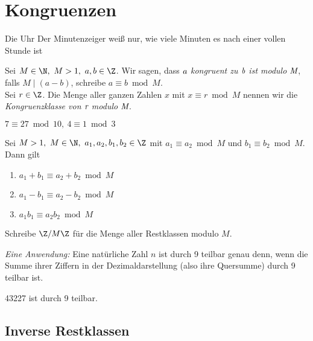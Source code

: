 \chapter{Kongruenzen}\video

\begin{exmp*}
	Die Uhr
	Der Minutenzeiger weiß nur, wie viele Minuten es nach einer vollen Stunde ist
\end{exmp*}

\begin{defn*}
	Sei $M \in \N,\ M > 1,\ a,b \in \Z$. Wir sagen, dass \emph{$\emph{a}$ kongruent zu $\emph{b}$ ist modulo $\emph{M}$}, falls \( M \mid (a-b) \), schreibe \( a \equiv b \bmod M \).\\
	Sei $r \in \Z$. Die Menge aller ganzen Zahlen $x$ mit $x \equiv r \bmod M$ nennen wir die \emph{Kongruenzklasse von $\emph{r}$ modulo $\emph{M}$}.
\end{defn*}

\begin{exmp*}
	\( 7 \equiv  27 \bmod 10,\ 4 \equiv 1 \bmod 3 \)
\end{exmp*}

\begin{lem}\autolabel
	Sei $M > 1,\ M \in \N,\ a_1,a_2,b_1,b_2 \in \Z$ mit $a_1 \equiv a_2 \bmod M$ und $b_1 \equiv b_2 \bmod M$. Dann gilt
	\begin{enumerate}[label={\roman*})]
		\item $a_1 + b_1 \equiv a_2 + b_2 \bmod M$
		\item $a_1 - b_1 \equiv a_2 - b_2 \bmod M$
		\item $a_1b_1 \equiv a_2b_2 \bmod M$
	\end{enumerate}
\end{lem}

\begin{notat*}
	Schreibe \( \Z / M\Z \) für die Menge aller Restklassen modulo $M$.
\end{notat*}

\emph{Eine Anwendung:} Eine natürliche Zahl $n$ ist durch 9 teilbar genau denn, wenn die Summe ihrer Ziffern in der Dezimaldarstellung (also ihre Quersumme) durch 9 teilbar ist.

\begin{exmp*}
	43227 ist durch 9 teilbar.
\end{exmp*}

\section*{Inverse Restklassen}

